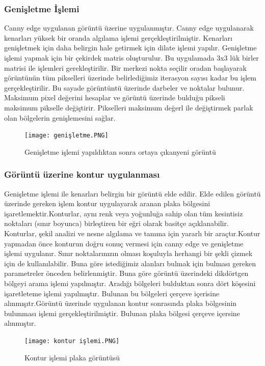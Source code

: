 \subsubsection{Genişletme İşlemi}
Canny edge uygulanan görüntü üzerine uygulanmıştır. Canny edge uygulanarak kenarları yüksek bir oranda algılama işlemi gerçekleştirilmiştir. Kenarları genişletmek için daha belirgin hale getirmek için dilate işlemi yapılır. Genişletme işlemi yapmak için bir çekirdek matris oluşturulur. Bu uygulamada 3x3 lük birler matrisi ile işlemleri gerekleştirilir. Bir merkezi nokta seçilir oradan başlayarak görüntünün tüm pikselleri üzerinde belirlediğimiz iterasyon sayısı kadar bu işlem gerçekleştirilir. Bu sayade görüntüntü üzerinde darbeler ve noktalar bulunur. Maksimum pixel değerini hesaplar ve görüntü üzerinde bulduğu pikseli maksimum pikselle değiştirir. Pikselleri maksimum değerl ile değiştirmek parlak olan bölgelerin genişlemesini sağlar.
\begin{figure}
    \centering
    \texttt{[image: genişletme.PNG]}
    \caption{Genişletme işlemi yapıldıktan sonra ortaya çıkanyeni görüntü}
    \label{fig:my_label}
\end{figure}
\subsubsection{Görüntü üzerine kontur uygulanması}
Genişletme işlemi ile kenarları belirgin bir görüntü elde edilir. Elde edilen görüntü üzerinde gereken işlem kontur uygulayarak aranan plaka bölgesini işaretlemektir.Konturlar, aynı renk veya yoğunluğa sahip olan tüm kesintisiz noktaları (sınır boyunca) birleştiren bir eğri olarak basitçe açıklanabilir. Konturlar, şekil analizi ve nesne algılama ve tanıma için yararlı bir araçtır.Kontur yapmadan önce konturun doğru sonuç vermesi için canny edge ve genişletme işlemi uygulanır. Sınır noktalarınızın olması koşuluyla herhangi bir şekli çizmek için de kullanılabilir. Buna göre istediğimiz alanları bulmak için bulması gereken parametreler önceden belirlenmiştir. Buna göre görüntü üzerindeki dikdörtgen bölgeyi arama işlemi yapılmıştır. Aradığı bölgeleri bulduktan sonra dört köşesini işaretleteme işlemi yapılmıştır. Bulunan bu bölgeleri çerçeve içerisine alınmışıtr.Görüntü üzerinde uygulanan kontur sonrasında plaka bölgesinin bulunması işlemi gerçekleştirilmiştir. Bulunan plaka bölgesi çerçeve içersine alınmıştır.
\begin{figure}
    \centering
    \texttt{[image: kontur işlemi.PNG]}
    \caption{Kontur işlemi plaka görüntüsü}
    \label{fig:my_label}
\end{figure}
